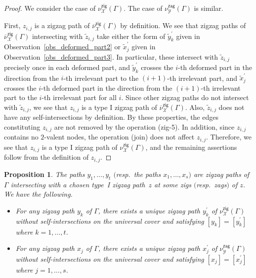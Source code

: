 \documentclass[11pt]{article}
\numberwithin{equation}{section}
\numberwithin{equation}{section}
\numberwithin{figure}{section}
\numberwithin{table}{section}
\newtheorem{Proposition}[Theorem]{Proposition}
 { \theoremstyle{definition}
\newtheorem{Definition}[Theorem]{Definition}
\newtheorem{Note}[Theorem]{Note}
\newtheorem{Example}[Theorem]{Example}
\newtheorem{Remark}[Theorem]{Remark}
\newtheorem{observation}[Theorem]{Observation}
\newtheorem{operation}[Theorem]{Operation}
\newtheorem{setting}[Theorem]{Setting}}
\newcommand{\calX}{\mathcal{X}}
\newcommand{\calY}{\mathcal{Y}}
\newcommand{\zig}{\mathsf{zig}}
\newcommand{\zag}{\mathsf{zag}}
\begin{document}
\begin{proof}
We consider the case of $\nu^\zig_\calX(\Gamma)$. The case of $\nu^\zag_\calY(\Gamma)$ is similar.

First, $z_{i,j}$ is a zigzag path of $\overline{\nu}^\zig_\calX(\Gamma)$ by definition.
We see that zigzag paths of $\overline{\nu}^\zig_\calX(\Gamma)$ intersecting with $\widetilde{z}_{i,j}$ take either the form of $\widetilde{y}_k^\prime$ given in Observation~\ref{obs_deformed_part2} or $\widetilde{x}_j^\prime$ given in Observation~\ref{obs_deformed_part3}.
In particular, these intersect with $\widetilde{z}_{i,j}$ precisely once in each deformed part, and
$\widetilde{y}_k^\prime$ crosses the $i$-th deformed part in the direction from the $i$-th irrelevant part to the $(i+1)$-th irrelevant part, and $\widetilde{x}_j^\prime$ crosses the $i$-th deformed part in the direction from the $(i+1)$-th irrelevant part to the $i$-th irrelevant part for all $i$.
Since other zigzag paths do not intersect with $\widetilde{z}_{i,j}$, we see that $z_{i,j}$ is a type I zigzag path of $\overline{\nu}^\zig_\calX(\Gamma)$.
Also, $\widetilde{z}_{i,j}$ does not have any self-intersections by definition.
By these properties, the edges constituting $z_{i,j}$ are not removed by the operation (zig-5).
In addition, since $z_{i,j}$ contains no $2$-valent nodes, the operation (join) does not affect $z_{i,j}$.
Therefore, we see that $z_{i,j}$ is a type I zigzag path of $\nu^\zig_\calX(\Gamma)$, and the remaining assertions follow from the definition of $z_{i,j}$.
\end{proof}

\begin{Proposition}\label{zigzag_afterdeform1}
The paths $y_1,\dots, y_t$ $($resp.\ the paths $x_1,\dots, x_s)$ are zigzag paths of $\Gamma$ intersecting with a chosen type~I zigzag path~$z$
at some zigs $($resp.\ zags$)$ of $z$. We have the following.
\begin{itemize}\itemsep=0pt
\item[\rm (1)] For any zigzag path $y_k$ of $\Gamma$, there exists a unique zigzag path $y_k^\prime$ of $\nu^\zig_\calX(\Gamma)$ without self-intersections
on the universal cover and satisfying $[y_k]=[y_k^\prime]$ where $k=1,\dots,t$.
\item[\rm (2)] For any zigzag path $x_j$ of $\Gamma$, there exists a unique zigzag path $x_j^\prime$ of $\nu^\zag_\calY(\Gamma)$ without self-intersections
on the universal cover and satisfying $[x_j]=[x_j^\prime]$ where $j=1,\dots,s$.
\end{itemize}
\end{Proposition}
\end{document}
